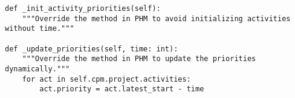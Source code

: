 \begin{lstlisting}[caption={The core functions of PHMDP. The PHMDP class inherits from PHM, therefore, it only overrides functions that deal with priorities.},label={Listing:implementation->phmdp->solve-function}]
def _init_activity_priorities(self):
	"""Override the method in PHM to avoid initializing activities without time."""

def _update_priorities(self, time: int):
	"""Override the method in PHM to update the priorities dynamically."""
	for act in self.cpm.project.activities:
		act.priority = act.latest_start - time
\end{lstlisting}